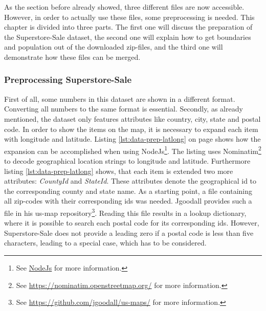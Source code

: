 As the section before already showed, three different files are now accessible. However, in order to actually use these files, some preprocessing is needed. This chapter is divided into three parts. The first one will discuss the preparation of the Superstore-Sale dataset, the second one will explain how to get boundaries and population out of the downloaded zip-files, and the third one will demonstrate how these files can be merged.

\subsubsection{Preprocessing Superstore-Sale}
First of all, some numbers in this dataset are shown in a different format. Converting all numbers to the same format is essential.
Secondly, as already mentioned, the dataset only features attributes like country, city, state and postal code. In order to show the items on the map, it is necessary to expand each item with longitude and latitude. Listing \ref{lst:data-prep-latlong} on page \pageref{lst:data-prep-latlong} shows how the expansion can be accomplished when using NodeJs\footnote{See \href{https://nodejs.org/en/}{NodeJs} for more information.}. The listing uses Nominatim\footnote{See \href{https://nominatim.openstreetmap.org/}{https://nominatim.openstreetmap.org/} for more information.} to decode geographical location strings to longitude and latitude. Furthermore listing \ref{lst:data-prep-latlong} shows, that each item is extended two more attributes: \textit{CountyId} and \textit{StateId}. These attributes denote the geographical id to the corresponding county and state name. As a starting point, a file containing all zip-codes with their corresponding ids was needed. Jgoodall provides such a file in his us-map repository\footnote{See \href{https://github.com/jgoodall/us-maps/}{https://github.com/jgoodall/us-maps/} for more information.}. Reading this file results in a lookup dictionary, where it is possible to search each postal code for its corresponding ids. However, Superstore-Sale does not provide a leading zero if a postal code is less than five characters, leading to a special case, which has to be considered.

